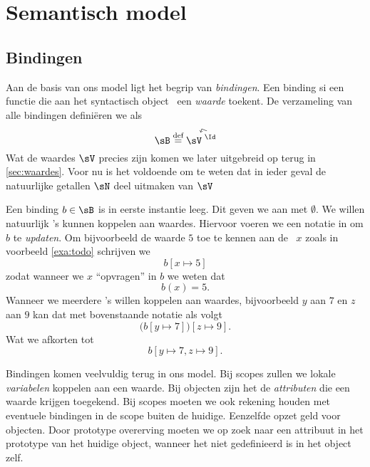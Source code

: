 \chapter{Semantisch model}

\section{Bindingen}\label{sec:bindinge}

Aan de basis van ons model ligt het begrip van \emph{bindingen}. Een binding si een functie die aan het syntactisch object \Id\ een \emph{waarde} toekent. De verzameling van alle bindingen definiëren we als 
  \begin{equation*}
  \sB \DEF \FiniteFunctions{\sV}{\Id}
  \end{equation*}
Wat de waardes $\sV$ precies zijn komen we later uitgebreid op terug in \ref{sec:waardes}. Voor nu is het voldoende om te weten dat in ieder geval de natuurlijke getallen $\sN$ deel uitmaken van $\sV$

Een binding $b\in\sB$ is in eerste instantie leeg. Dit geven we aan met $\emptyset$. We willen natuurlijk \Id's kunnen koppelen aan waardes. Hiervoor voeren we een notatie in om $b$ te \emph{updaten}. Om bijvoorbeeld de waarde $5$ toe te kennen aan de \Id\ $x$ zoals in voorbeeld \ref{exa:todo} schrijven we
\begin{equation*}
  b[x \mapsto 5]
\end{equation*}
zodat wanneer we $x$ ``opvragen'' in $b$ we weten dat
\begin{equation*}
  b(x) = 5.
\end{equation*}
Wanneer we meerdere \Id's willen koppelen aan waardes, bijvoorbeeld $y$ aan $7$ en $z$ aan $9$ kan dat met bovenstaande notatie als volgt
\begin{equation*}
  \big(b[y \mapsto 7]\big)[z \mapsto 9].
\end{equation*}
Wat we afkorten tot
\begin{equation*}
  b[y \mapsto 7, z \mapsto 9].
\end{equation*}

Bindingen komen veelvuldig terug in ons model. Bij scopes zullen we lokale \emph{variabelen} koppelen aan een waarde. Bij objecten zijn het de \emph{attributen} die een waarde krijgen toegekend. Bij scopes moeten we ook rekening houden met eventuele bindingen in de scope buiten de huidige. Eenzelfde opzet geld voor objecten. Door prototype overerving moeten we op zoek naar een attribuut in het prototype van het huidige object, wanneer het niet gedefinieerd is in het object zelf.

